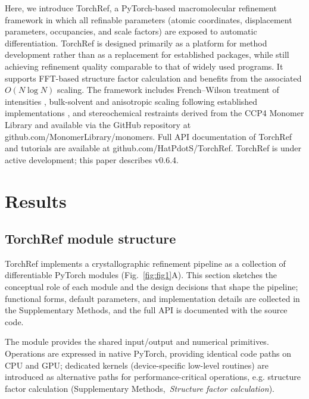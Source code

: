 \documentclass{iucrjournals}
\newcommand{\suppref}[1]{Supplementary Methods,~\emph{#1}}
\newcommand{\suppparen}[1]{(\suppref{#1})}
\begin{document}
Here, we introduce TorchRef, a PyTorch-based macromolecular refinement framework in which all
refinable parameters (atomic coordinates, displacement parameters, occupancies, and scale
factors) are exposed to automatic differentiation.
TorchRef is designed primarily as a platform for method development rather than as a 
replacement for established packages, while still achieving refinement quality comparable to that of 
widely used programs. It supports FFT-based structure factor calculation and benefits from the associated $O(N\log N)$ scaling.
The framework includes French--Wilson treatment of intensities
\cite{french_treatment_1978}, bulk-solvent and anisotropic scaling following
established implementations
\cite{adams_phenix_2010,blanc_refinement_2004,afonine_robust_2005}, and
stereochemical restraints derived from the CCP4 Monomer Library and available
via the GitHub repository at github.com/MonomerLibrary/monomers.
Full API documentation of TorchRef and tutorials are available at
github.com/HatPdotS/TorchRef. TorchRef is under active development; this paper describes v0.6.4.

\section{Results}

\subsection{TorchRef module structure}

TorchRef implements a crystallographic refinement pipeline as a
collection of differentiable PyTorch modules (Fig.\ \ref{fig:fig1}A).
This section sketches the conceptual role of each module and the
design decisions that shape the pipeline; functional forms, default
parameters, and implementation details are collected in the
Supplementary Methods, and the full API is documented with the source
code.

The  module provides the shared input/output and numerical
primitives.
Operations are expressed in native PyTorch, providing identical code paths on CPU and
GPU; dedicated kernels (device-specific low-level routines) are introduced as alternative paths for performance-critical operations, e.g. structure factor calculation \suppparen{Structure factor calculation}.
\end{document}
